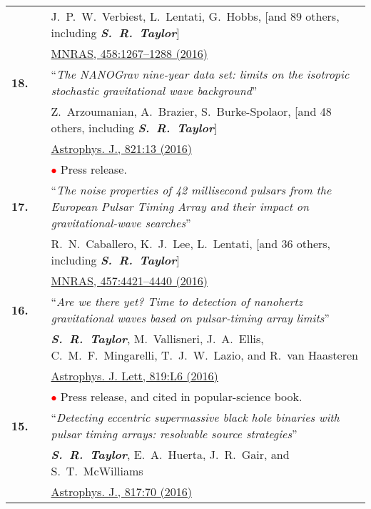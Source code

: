 \documentclass[11pt,letterpaper,sans]{moderncv}
\begin{document}
{\begin{longtable}{rp{0.3cm}p{15.8cm}}
&& J.~P.~W.~Verbiest, L.~Lentati, G.~Hobbs, [and 89 others, including \textit{\textbf{S.~R.~Taylor}}] \\ 
&&  \href{http://mnras.oxfordjournals.org/content/458/2/1267}{{\color{color1} MNRAS, 458:1267--1288 (2016)}} \vspace{0.09cm}\\
\textbf{18.} & & ``\textit{The NANOGrav nine-year data set: limits on the isotropic stochastic gravitational wave background}'' \\ 
&& Z.~Arzoumanian, A.~Brazier, S.~Burke-Spolaor, [and 48 others, including \textit{\textbf{S.~R.~Taylor}}] \\ 
&&  \href{http://iopscience.iop.org/article/10.3847/0004-637X/821/1/13/meta}{{\color{color1} Astrophys. J., 821:13 (2016)}} \\
&& \textcolor{red}{$\bullet$} Press release. \vspace{0.09cm}\\
\textbf{17.} & & ``\textit{The noise properties of 42 millisecond pulsars from the European Pulsar Timing Array and their impact on gravitational-wave searches}'' \\ 
&& R.~N.~Caballero, K.~J.~Lee, L.~Lentati, [and 36 others, including \textit{\textbf{S.~R.~Taylor}}] \\ 
&&  \href{http://mnras.oxfordjournals.org/content/457/4/4421}{{\color{color1} MNRAS, 457:4421--4440 (2016)}} \vspace{0.09cm}\\
\textbf{16.} & & ``\textit{Are we there yet? Time to detection of nanohertz gravitational waves based on pulsar-timing array limits}'' \\ 
&& \textit{\textbf{S.~R.~Taylor}}, M.~Vallisneri, J.~A.~Ellis, C.~M.~F.~Mingarelli, T.~J.~W.~Lazio, and R.~van Haasteren \\ 
&&  \href{http://iopscience.iop.org/article/10.3847/2041-8205/819/1/L6/meta}{{\color{color1} Astrophys. J. Lett, 819:L6 (2016)}} \\
&& \textcolor{red}{$\bullet$} Press release, and cited in popular-science book. \vspace{0.09cm}\\
\textbf{15.} & & ``\textit{Detecting eccentric supermassive black hole binaries with pulsar timing arrays: resolvable source strategies}'' \\ 
&& \textit{\textbf{S.~R.~Taylor}}, E.~A.~Huerta, J.~R.~Gair, and S.~T.~McWilliams \\ 
&& \href{http://iopscience.iop.org/article/10.3847/0004-637X/817/1/70/meta}{{\color{color1} Astrophys. J., 817:70 (2016)}} \vspace{0.09cm}\\

\end{longtable}}
\end{document}
